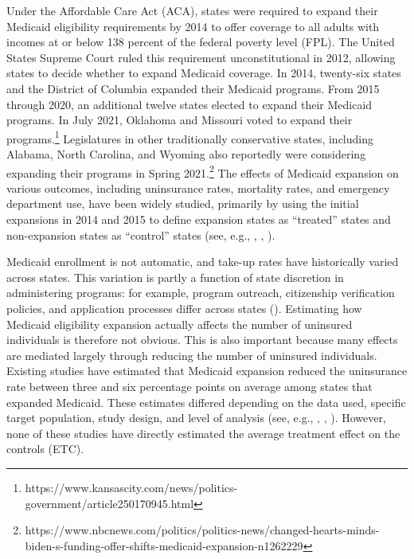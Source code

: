 \documentclass[aoas]{imsart}
\theoremstyle{plain}
\theoremstyle{remark}
\begin{document}
Under the Affordable Care Act (ACA), states were required to expand their Medicaid eligibility requirements by 2014 to offer coverage to all adults with incomes at or below 138 percent of the federal poverty level (FPL). The United States Supreme Court ruled this requirement unconstitutional in 2012, allowing states to decide whether to expand Medicaid coverage. In 2014, twenty-six states and the District of Columbia expanded their Medicaid programs. From 2015 through 2020, an additional twelve states elected to expand their Medicaid programs. In July 2021, Oklahoma and Missouri voted to expand their programs.\footnote{https://www.kansascity.com/news/politics-government/article250170945.html} Legislatures in other traditionally conservative states, including Alabama, North Carolina, and Wyoming also reportedly were considering expanding their programs in Spring 2021.\footnote{https://www.nbcnews.com/politics/politics-news/changed-hearts-minds-biden-s-funding-offer-shifts-medicaid-expansion-n1262229} The effects of Medicaid expansion on various outcomes, including uninsurance rates, mortality rates, and emergency department use, have been widely studied, primarily by using the initial expansions in 2014 and 2015 to define expansion states as ``treated'' states and non-expansion states as ``control'' states (see, e.g., \cite{courtemanche2017early}, \cite{wherry2016early}, \cite{ladhania2021effect}).

Medicaid enrollment is not automatic, and take-up rates have historically varied across states. This variation is partly a function of state discretion in administering programs: for example, program outreach, citizenship verification policies, and application processes differ across states (\cite{courtemanche2017early}). Estimating how Medicaid eligibility expansion actually affects the number of uninsured individuals is therefore not obvious. This is also important because many effects are mediated largely through reducing the number of uninsured individuals. Existing studies have estimated that Medicaid expansion reduced the uninsurance rate between three and six percentage points on average among states that expanded Medicaid. These estimates differed depending on the data used, specific target population, study design, and level of analysis (see, e.g., \cite{kaestner2017effects}, \cite{courtemanche2017early}, \cite{frean2017premium}). However, none of these studies have directly estimated the average treatment effect on the controls (ETC). 
\end{document}
